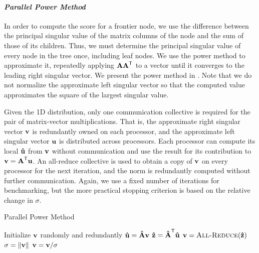 \documentclass[conference,compsoc]{IEEEtran}
\begin{document}
\paragraph{\emph{Parallel Power Method}}

In order to compute the score for a frontier node, we use the difference between the principal singular value of the matrix columns of the node and the sum of those of its children.
Thus, we must determine the principal singular value of every node in the tree once, including leaf nodes.
We use the power method to approximate it, repeatedly applying $\M{A}\M{A}^\Tra$ to a vector until it converges to the leading right singular vector.
We present the power method in .
Note that we do not normalize the approximate left singular vector so that the computed value approximates the square of the largest singular value.

Given the 1D distribution, only one communication collective is required for the pair of matrix-vector multiplications.
That is, the approximate right singular vector $\V{v}$ is redundantly owned on each processor, and the approximate left singular vector $\V{u}$ is distributed across processors.
Each processor can compute its local $\V[\hat]{u}$ from $\V{v}$ without communication and use the result for its contribution to $\V{v}=\M{A}^\Tra \V{u}$.
An all-reduce collective is used to obtain a copy of $\V{v}$ on every processor for the next iteration, and the norm is redundantly computed without further communication.
Again, we use a fixed number of iterations for benchmarking, but the more practical stopping criterion is based on the relative change in $\sigma$.

\begin{algorithm}
\caption{Parallel Power Method}
\label{alg:parpowmeth}
\begin{algorithmic}[1]
		\State Initialize $\V{v}$ randomly and redundantly
			\State $\V[\hat]{u} = \M[\hat]{A} \V{v}$
			\State $\V[\hat]{z} = \M[\hat]{A}^\Tra \V[\hat]{u}$
			\State $\V{v} = \textsc{All-Reduce}(\V[\hat]{z})$
			\State $\sigma = \|\V{v}\|$
			\State $\V{v} = \V{v}/\sigma$
		\EndWhile
	\EndFunction
\end{algorithmic}
\end{algorithm}
\end{document}
